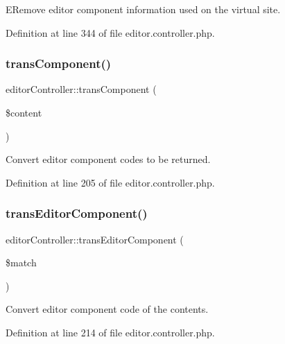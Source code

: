 E\+Remove editor component information used on the virtual site. 



Definition at line 344 of file editor.\+controller.\+php.

\hypertarget{classeditorController_a9ef6499da56cf876c70813624ae4a2c0}{}\label{classeditorController_a9ef6499da56cf876c70813624ae4a2c0} 
\subsubsection{\texorpdfstring{trans\+Component()}{transComponent()}}
{\footnotesize\ttfamily editor\+Controller\+::trans\+Component (\begin{DoxyParamCaption}\item[{}]{\$content }\end{DoxyParamCaption})}



Convert editor component codes to be returned. 



Definition at line 205 of file editor.\+controller.\+php.

\hypertarget{classeditorController_a278ef1204d8129636bb8d30a0c91c5bb}{}\label{classeditorController_a278ef1204d8129636bb8d30a0c91c5bb} 
\subsubsection{\texorpdfstring{trans\+Editor\+Component()}{transEditorComponent()}}
{\footnotesize\ttfamily editor\+Controller\+::trans\+Editor\+Component (\begin{DoxyParamCaption}\item[{}]{\$match }\end{DoxyParamCaption})}



Convert editor component code of the contents. 



Definition at line 214 of file editor.\+controller.\+php.

\hypertarget{classeditorController_acccfd1dab6c8c48a2eb232ae2e46e6bf}{}\label{classeditorController_acccfd1dab6c8c48a2eb232ae2e46e6bf} 
